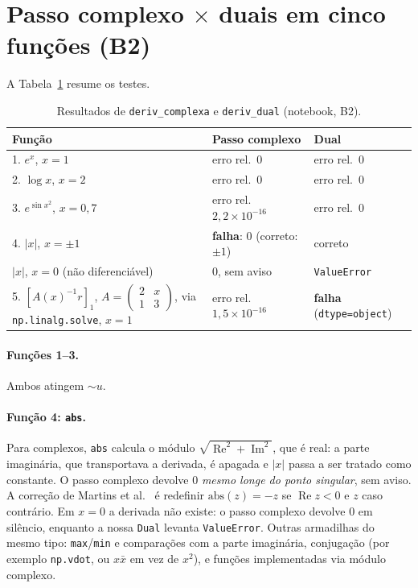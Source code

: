 \documentclass[11pt,a4paper]{article}
\renewcommand{\Im}{\operatorname{Im}}
\renewcommand{\Re}{\operatorname{Re}}
\begin{document}
\section{Passo complexo $\times$ duais em cinco funções (B2)}

A Tabela~\ref{tab:b2} resume os testes.

\begin{table}[h]
\centering\small
\begin{tabular}{p{4.8cm}p{4.2cm}p{4.6cm}}
\toprule
Função & Passo complexo & Dual \\
\midrule
1. $e^x$, $x=1$ & erro rel.\ $0$ & erro rel.\ $0$ \\
2. $\log x$, $x=2$ & erro rel.\ $0$ & erro rel.\ $0$ \\
3. $e^{\sin x^2}$, $x=0{,}7$ & erro rel.\ $2{,}2\times10^{-16}$ & erro rel.\ $0$ \\
4. $|x|$, $x=\pm1$ & \textbf{falha}: $0$ (correto: $\pm1$) & correto \\
\phantom{4.} $|x|$, $x=0$ (não diferenciável) & $0$, sem aviso & \texttt{ValueError} \\
5. $[A(x)^{-1}r]_1$, $A=\left(\begin{smallmatrix}2&x\\1&3\end{smallmatrix}\right)$, via \texttt{np.linalg.solve}, $x=1$ & erro rel.\ $1{,}5\times10^{-16}$ & \textbf{falha} (\texttt{dtype=object}) \\
\bottomrule
\end{tabular}
\caption{Resultados de \texttt{deriv\_complexa} e \texttt{deriv\_dual} (notebook, B2).}
\label{tab:b2}
\end{table}

\paragraph{Funções 1--3.} Ambos atingem $\sim u$.

\paragraph{Função 4: \texttt{abs}.} Para complexos, \texttt{abs} calcula o módulo $\sqrt{\Re^2+\Im^2}$, que é real: a parte imaginária, que transportava a derivada, é apagada e $|x|$ passa a ser tratado como constante. O passo complexo devolve $0$ \emph{mesmo longe do ponto singular}, sem aviso. A correção de Martins et al.~\cite{martins2003} é redefinir $\mathrm{abs}(z) = -z$ se $\Re z<0$ e $z$ caso contrário. Em $x=0$ a derivada não existe: o passo complexo devolve $0$ em silêncio, enquanto a nossa \texttt{Dual} levanta \texttt{ValueError}. Outras armadilhas do mesmo tipo: \texttt{max}/\texttt{min} e comparações com a parte imaginária, conjugação (por exemplo \texttt{np.vdot}, ou $x\bar x$ em vez de $x^2$), e funções implementadas via módulo complexo.
\end{document}
